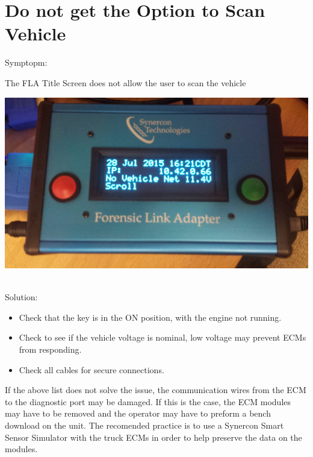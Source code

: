 \documentclass[11pt, oneside]{book}
\begin{document}
\section{Do not get the Option to Scan Vehicle}
Symptopm:\\
\noindent\begin{minipage}{0.45\textwidth}%
The FLA Title Screen does not allow the user to scan the vehicle
\end{minipage}%
\hfill%
\begin{minipage}{0.45\textwidth}
\includegraphics[width=\linewidth]{../media/fla_screens/title_screen_no_veh_net}
\end{minipage}\\
Solution:\\
\begin{itemize}
\item Check that the key is in the ON position, with the engine not running.
\item Check to see if the vehicle voltage is nominal, low voltage may prevent ECMs from responding.
\item Check all cables for secure connections.
\end{itemize}
If the above list does not solve the issue, the communication wires from the ECM to the diagnostic port may be damaged. If this is the case, the ECM modules may have to be removed and the operator may have to preform a bench download on the unit. The recomended practice is to use a Synercon Smart Sensor Simulator with the truck ECMs in order to help preserve the data on the modules.
\end{document}
